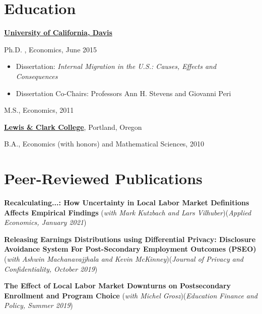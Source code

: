 \documentclass[margin,line]{res}
\newenvironment{list1}{
  \begin{list}{\ding{113}}{%
      \setlength{\itemsep}{0in}
      \setlength{\parsep}{0in} \setlength{\parskip}{0in}
      \setlength{\topsep}{0in} \setlength{\partopsep}{0in} 
      \setlength{\leftmargin}{0.17in}}}{\end{list}}
\begin{document}
\begin{resume}
\section{\sc Education}
\href{http://www.econ.ucdavis.edu/}{\bf University of California, Davis}\\
\vspace*{-.15in}\begin{list1}
\item[] Ph.D. , Economics, June 2015
	\begin{itemize}
 \setlength{\itemsep}{0cm}%
  \setlength{\parskip}{0cm}%
		\item Dissertation: \textit{Internal Migration in the U.S.: Causes, Effects and Consequences}
		\item Dissertation Co-Chairs: Professors Ann H. Stevens and Giovanni Peri
	\end{itemize}

\vspace*{-.05in}
\item[] M.S., Economics, 2011
\end{list1}

\href{http://college.lclark.edu/departments/economics/}{\bf Lewis \& Clark College}, Portland, Oregon\\
\vspace*{-.15in}
\begin{list1}
\item[] B.A., Economics (with honors) and Mathematical Sciences, 2010
\end{list1}


\section{\sc Peer-Reviewed Publications}

\textbf{Recalculating...: How Uncertainty in Local Labor Market Definitions Affects Empirical Findings} (\emph{with Mark Kutzbach and Lars Vilhuber})(\emph{Applied Economics,  January 2021})

\textbf{Releasing Earnings Distributions using Differential Privacy: Disclosure Avoidance System For Post-Secondary Employment Outcomes (PSEO)}(\emph{with Ashwin Machanavajjhala and Kevin McKinney})(\emph{Journal of Privacy and Confidentiality, October 2019})

\textbf{The Effect of Local Labor Market Downturns on Postsecondary Enrollment and Program Choice} (\emph{with Michel Grosz})(\emph{Education Finance and Policy, Summer 2019})


\end{resume}
\end{document}
